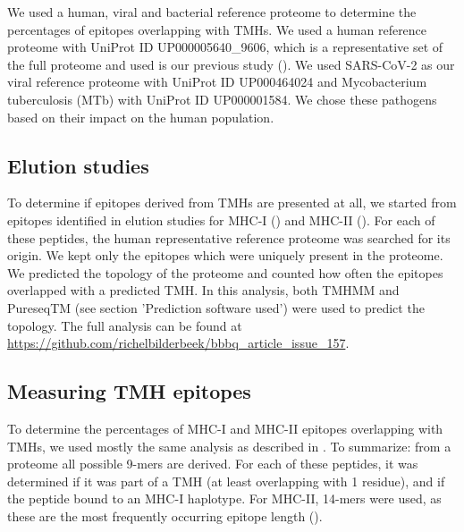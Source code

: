 
We used a human, viral and bacterial reference proteome to 
determine the percentages of epitopes overlapping
with TMHs.
We used a human reference proteome
with UniProt ID UP000005640\_9606, which
is a representative set of the full proteome
and used is our previous study (\cite{bianchi2017}).
We used SARS-CoV-2 as our viral reference proteome
with UniProt ID UP000464024 and
Mycobacterium tuberculosis (MTb) 
with UniProt ID UP000001584.
We chose these pathogens based on their impact on the human population.

\subsection{Elution studies}\label{subsec:elution_studies}

To determine if epitopes derived from TMHs are presented at all,
we started from epitopes identified in elution studies
for MHC-I (\cite{schellens2015comprehensive}) 
and MHC-II (\cite{bergseng2015different}).
For each of these peptides, the human representative reference proteome
was searched for its origin.
We kept only the epitopes which were uniquely present
in the proteome.
We predicted the topology of the proteome
and counted how often the epitopes overlapped
with a predicted TMH.
In this analysis, both TMHMM and 
PureseqTM (see section 'Prediction software used') 
were used to predict the topology.
The full analysis can be found
at \url{https://github.com/richelbilderbeek/bbbq_article_issue_157}.

\subsection{Measuring TMH epitopes}

To determine the percentages of MHC-I and MHC-II epitopes overlapping
with TMHs, we used mostly the same analysis as described in \cite{bianchi2017}.
To summarize: from a proteome all possible 9-mers are derived. For each
of these peptides, it was determined if it was part of a 
TMH (at least overlapping with 1 residue), 
and if the peptide bound to an MHC-I haplotype.
For MHC-II, 14-mers were used, as these are the most frequently occurring
epitope length (\cite{bergseng2015different}).

